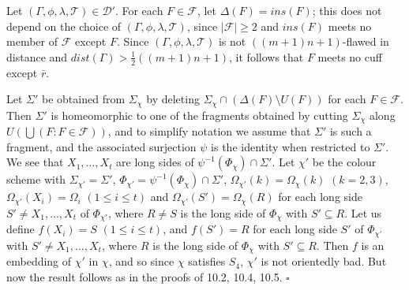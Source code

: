 Let $(\Gamma, \phi, \lambda, \mathscr{T}) \in \mathscr{D}'$. For each $F \in \mathscr{F}$, let $\Delta(F) = ins(F)$; this does not depend on the choice of $(\Gamma, \phi, \lambda, \mathscr{T})$, since $|\mathscr{F}| \ge 2$ and $ins(F)$ meets no member of $\mathscr{F}$ except $F$. Since $(\Gamma, \phi, \lambda, \mathscr{T})$ is not $((m+1)n+1)$-flawed in distance and $dist(\Gamma) > \frac{1}{2}((m+1)n+1)$, it follows that $F$ meets no cuff except $\bar{r}$.

Let $\Sigma'$ be obtained from $\Sigma_\chi$ by deleting $\Sigma_\chi \cap (\Delta(F) \setminus U(F))$ for each $F \in \mathscr{F}$. Then $\Sigma'$ is homeomorphic to one of the fragments obtained by cutting $\Sigma_\chi$ along $U(\bigcup(F : F \in \mathscr{F}))$, and to simplify notation we assume that $\Sigma'$ is such a fragment, and the associated surjection $\psi$ is the identity when restricted to $\Sigma'$. We see that $X_1, \ldots, X_t$ are long sides of $\psi^{-1}(\Phi_\chi) \cap \Sigma'$. Let $\chi'$ be the colour scheme with $\Sigma_{\chi'} = \Sigma'$, $\Phi_{\chi'} = \psi^{-1}(\Phi_\chi) \cap \Sigma'$, $\Omega_{\chi'}(k) = \Omega_\chi(k)$ $(k = 2, 3)$, $\Omega_{\chi'}(X_i) = \Omega_i$ $(1 \le i \le t)$ and $\Omega_{\chi'}(S') = \Omega_\chi(R)$ for each long side $S' \ne X_1, \ldots, X_t$ of $\Phi_{\chi'}$, where $R \ne S$ is the long side of $\Phi_\chi$ with $S' \subseteq R$. Let us define $f(X_i) = S$ $(1 \le i \le t)$, and $f(S') = R$ for each long side $S'$ of $\Phi_{\chi'}$ with $S' \ne X_1, \ldots, X_t$, where $R$ is the long side of $\Phi_\chi$ with $S' \subseteq R$. Then $f$ is an embedding of $\chi'$ in $\chi$, and so since $\chi$ satisfies $S_4$, $\chi'$ is not orientedly bad. But now the result follows as in the proofs of 10.2, 10.4, 10.5. $\square$
